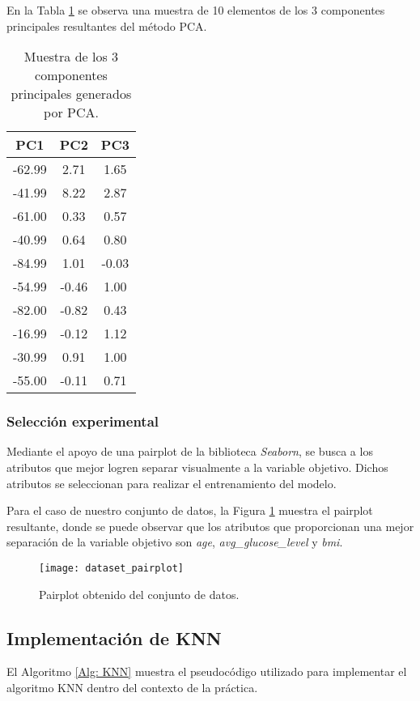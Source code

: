 En la Tabla \ref{Tab: PCA} se observa una muestra de 10 elementos de los 3 componentes principales resultantes del método PCA.

\begin{table}[htbp]
	\centering
	\caption{Muestra de los 3 componentes principales generados por PCA.}
	\begin{tabular}{ccc}
		\hline\hline
		PC1    & PC2   & PC3    \\ 
		\hline\hline
		-62.99 & 2.71  & 1.65   \\
		-41.99 & 8.22  & 2.87   \\
		-61.00 & 0.33  & 0.57   \\
		-40.99 & 0.64  & 0.80   \\
		-84.99 & 1.01  & -0.03  \\
		-54.99 & -0.46 & 1.00   \\
		-82.00 & -0.82 & 0.43   \\
		-16.99 & -0.12 & 1.12   \\
		-30.99 & 0.91  & 1.00   \\
		-55.00 & -0.11 & 0.71   \\
		\hline\hline
	\end{tabular}
	\label{Tab: PCA}
\end{table}

\subsubsection{Selección experimental}
Mediante el apoyo de una pairplot de la biblioteca \emph{Seaborn}, se busca a los atributos que mejor logren separar visualmente a la variable objetivo. Dichos atributos se seleccionan para realizar el entrenamiento del modelo.

Para el caso de nuestro conjunto de datos, la Figura \ref{Fig: Experimental} muestra el pairplot resultante, donde se puede observar que los atributos que proporcionan una mejor separación de la variable objetivo son \emph{age}, \emph{avg\_glucose\_level} y \emph{bmi}.

\begin{figure}[htbp]
	\centering
	\texttt{[image: dataset\_pairplot]}
	\caption{Pairplot obtenido del conjunto de datos.}
	\label{Fig: Experimental}
\end{figure}

\FloatBarrier
\subsection{Implementación de KNN}
El Algoritmo \ref{Alg: KNN} muestra el pseudocódigo utilizado para implementar el algoritmo KNN dentro del contexto de la práctica.

